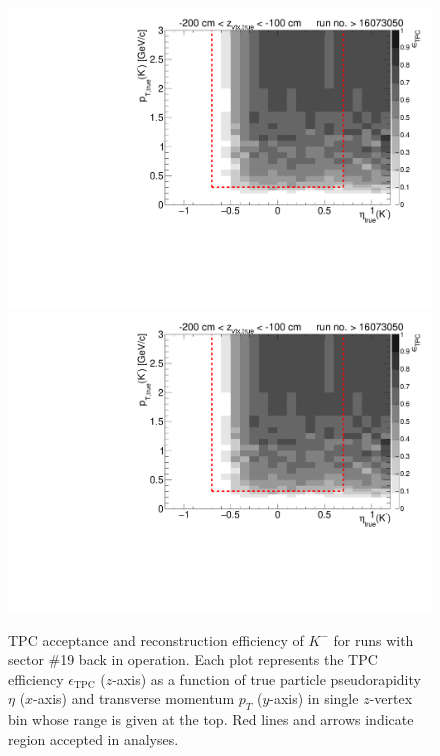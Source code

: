 \begin{figure}[hb]
	\caption[TPC acceptance and reconstruction efficiency of $K^{-}$ for runs with sector \#19 back in operation.]{TPC acceptance and reconstruction efficiency of $K^{-}$ for runs with sector \#19 back in operation. Each plot represents the TPC efficiency $\epsilon_{\text{TPC}}$ ($z$-axis) as a function of true particle pseudorapidity $\eta$ ($x$-axis) and transverse momentum $p_{T}$ ($y$-axis) in single $z$-vertex bin whose range is given at the top. Red lines and arrows indicate region accepted in analyses.}\label{fig:tpcEff_kaon_minus1}
	\centering
	\parbox{0.495\textwidth}{
		\centering
		\includegraphics[width=\linewidth,page=3]{graphics/eff/Eff2D_TPC_kaon_Minus_RunRange2.pdf}\\
		\includegraphics[width=\linewidth,page=5]{graphics/eff/Eff2D_TPC_kaon_Minus_RunRange2.pdf}\\
}
\end{figure}
